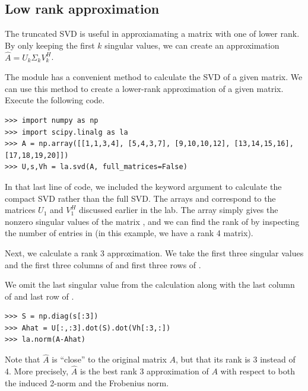 \subsection*{Low rank approximation}
The truncated SVD is useful in approxiamating a matrix with one of lower rank.
By only keeping the first $k$ singular values, we can create an approximation $\widehat A = U_k\Sigma_k V_k^H$.

The  module has a convenient method to calculate the SVD of a given matrix. We can use
this method to create a lower-rank approximation of a given matrix. Execute the following code.
\begin{lstlisting}
>>> import numpy as np
>>> import scipy.linalg as la
>>> A = np.array([[1,1,3,4], [5,4,3,7], [9,10,10,12], [13,14,15,16], [17,18,19,20]])
>>> U,s,Vh = la.svd(A, full_matrices=False)
\end{lstlisting}
In that last line of code, we included the keyword argument  to calculate the
compact SVD rather than the full SVD. The arrays  and  correspond to the matrices
$U_1$ and $V_1^H$ discussed earlier in the lab. The array  simply gives the nonzero singular values
of the matrix , and we can find the rank of  by inspecting the number of entries in  (in this
example, we have a rank 4 matrix). 

Next, we calculate a rank 3 approximation.
We take the first three singular values and the first three columns of  and first three rows of .

We omit the last singular value from the calculation along with the last column of  and last row of .

\begin{lstlisting}
>>> S = np.diag(s[:3])
>>> Ahat = U[:,:3].dot(S).dot(Vh[:3,:])
>>> la.norm(A-Ahat)
\end{lstlisting}
Note that $\widehat A$ is ``close'' to the original matrix $A$, but that its rank is 3 instead of 4. More
precisely, $\widehat A$ is the best rank 3 approximation of $A$ with respect to both the induced 2-norm and
the Frobenius norm. 

